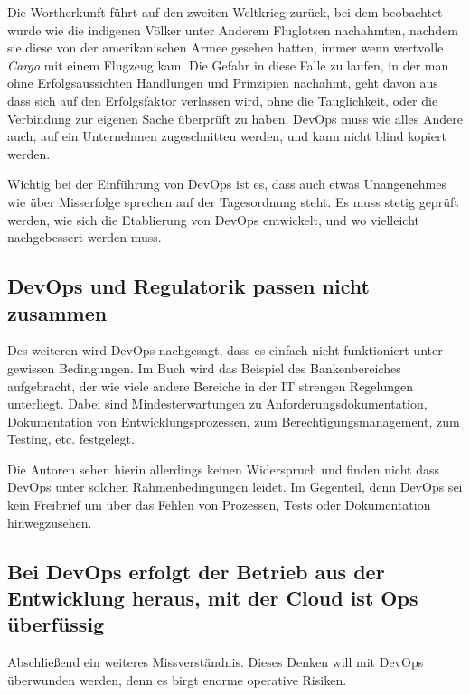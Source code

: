 Die Wortherkunft führt auf den zweiten Weltkrieg zurück, bei dem beobachtet wurde wie die indigenen Völker unter Anderem Fluglotsen nachahmten, nachdem sie diese von der amerikanischen Armee gesehen hatten, immer wenn wertvolle \textit{Cargo} mit einem Flugzeug kam. Die Gefahr in diese Falle zu laufen, in der man ohne Erfolgsaussichten Handlungen und Prinzipien nachahmt, geht davon aus dass sich auf den Erfolgsfaktor verlassen wird, ohne die Tauglichkeit, oder die Verbindung zur eigenen Sache überprüft zu haben. \ac{DevOps} muss wie alles Andere auch, auf ein Unternehmen zugeschnitten werden, und kann nicht blind kopiert werden.

Wichtig bei der Einführung von \ac{DevOps} ist es, dass auch etwas Unangenehmes wie über Misserfolge sprechen auf der Tagesordnung steht. Es muss stetig geprüft werden, wie sich die Etablierung von \ac{DevOps} entwickelt, und wo vielleicht nachgebessert werden muss.

\subsection{DevOps und Regulatorik passen nicht zusammen}

Des weiteren wird \ac{DevOps} nachgesagt, dass es einfach nicht funktioniert unter gewissen Bedingungen. Im Buch wird das Beispiel des Bankenbereiches aufgebracht, der wie viele andere Bereiche in der IT strengen Regelungen unterliegt. Dabei sind \glqq Mindesterwartungen zu Anforderungsdokumentation,
Dokumentation von Entwicklungsprozessen, zum Berechtigungsmanagement, zum Testing, etc. festgelegt\grqq \cite{halstenberg:2020}.

Die Autoren sehen hierin allerdings keinen Widerspruch und finden nicht dass \ac{DevOps} unter solchen Rahmenbedingungen leidet. Im Gegenteil, denn \ac{DevOps} sei kein Freibrief um über das Fehlen von Prozessen, Tests oder Dokumentation hinwegzusehen.

\subsection{Bei DevOps erfolgt der Betrieb aus der Entwicklung heraus, mit der Cloud ist Ops überfüssig}

Abschließend ein weiteres Missverständnis. Dieses Denken will mit \ac{DevOps} überwunden werden, denn es birgt enorme \glqq operative Risiken\grqq \cite{halstenberg:2020}.
